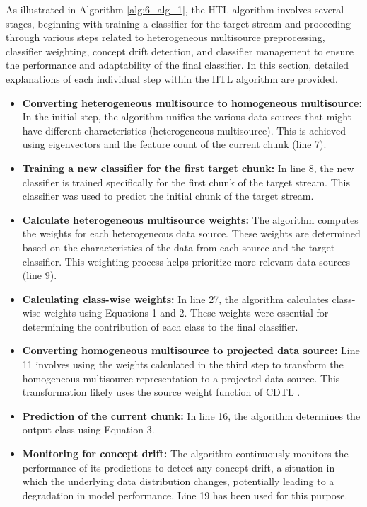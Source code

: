 As illustrated in Algorithm \ref{alg:6_alg_1}, the HTL algorithm involves several stages, beginning with training a classifier for the target stream and proceeding through various steps related to heterogeneous multisource preprocessing, classifier weighting, concept drift detection, and classifier management to ensure the performance and adaptability of the final classifier. In this section, detailed explanations of each individual step within the HTL algorithm are provided.
\begin{itemize}
	\setlength{\itemsep}{0pt}
    \setlength{\parskip}{0pt}
	\item \textbf{Converting heterogeneous multisource to homogeneous multisource:} In the initial step, the algorithm unifies the various data sources that might have different characteristics (heterogeneous multisource). This is achieved using eigenvectors and the feature count of the current chunk (line 7).
	\item \textbf{Training a new classifier for the first target chunk:} In line 8, the new classifier is trained specifically for the first chunk of the target stream. This classifier was used to predict the initial chunk of the target stream.
	\item \textbf{Calculate heterogeneous multisource weights:} The algorithm computes the weights for each heterogeneous data source. These weights are determined based on the characteristics of the data from each source and the target classifier. This weighting process helps prioritize more relevant data sources (line 9).
	\item \textbf{Calculating class-wise weights:} In line 27, the algorithm calculates class-wise weights using Equations 1 and 2. These weights were essential for determining the contribution of each class to the final classifier.
	\item \textbf{Converting homogeneous multisource to projected data source:} Line 11 involves using the weights calculated in the third step to transform the homogeneous multisource representation to a projected data source. This transformation likely uses the source weight function of CDTL \cite{yang2021concept}.
	\item \textbf{Prediction of the current chunk:} In line 16, the algorithm determines the output class using Equation 3.
	\item \textbf{Monitoring for concept drift:} The algorithm continuously monitors the performance of its predictions to detect any concept drift, a situation in which the underlying data distribution changes, potentially leading to a degradation in model performance. Line 19 has been used for this purpose.

\end{itemize}
